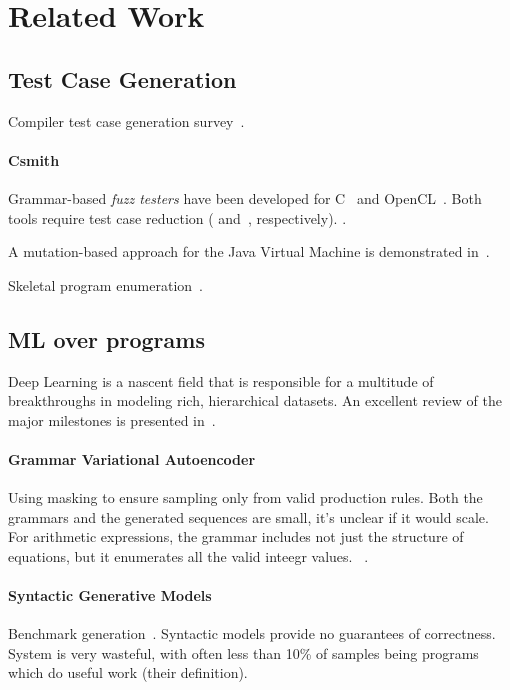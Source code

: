 \section{Related Work}\label{sec:rw}

\subsection{Test Case Generation}

Compiler test case generation survey~\cite{Boujarwah1997}.

\paragraph{Csmith} Grammar-based \emph{fuzz testers} have been developed for C~\cite{Yang2012} and OpenCL~\cite{Lidbury2015a}. Both tools require test case reduction (\cite{Regehr2012a} and~\cite{Pflanzer2016}, respectively). .

A mutation-based approach for the Java Virtual Machine is demonstrated in~\cite{Chena}.

Skeletal program enumeration~\cite{Zhang2016b}.


\subsection{ML over programs} 

Deep Learning is a nascent field that is responsible for a multitude of breakthroughs in modeling rich, hierarchical datasets. An excellent review of the major milestones is presented in~\cite{Wang2017}.

\paragraph{Grammar Variational Autoencoder} Using masking to ensure sampling only from valid production rules. Both the grammars and the generated sequences are small, it's unclear if it would scale. For arithmetic expressions, the grammar includes not just the structure of equations, but it enumerates all the valid inteegr values. ~\cite{Kusner2017}.

\paragraph{Syntactic Generative Models} Benchmark generation~\cite{Cummins2017a}. Syntactic models provide no guarantees of correctness. System is very wasteful, with often less than 10\% of samples being programs which do useful work (their definition).

